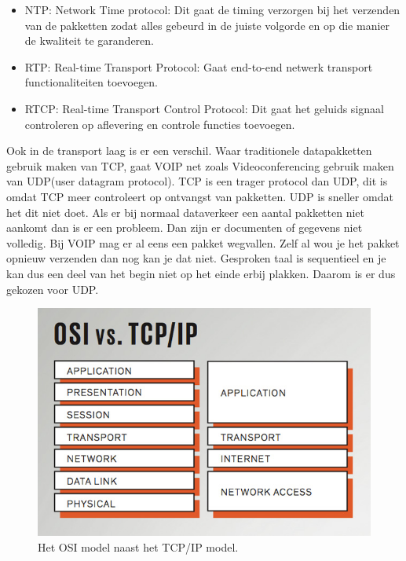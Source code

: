 \documentclass[pdftex,a4paper,12pt,twoside]{report}
\begin{document}
\begin{itemize}
	\item NTP: Network Time protocol: Dit gaat de timing verzorgen bij het verzenden van de pakketten zodat alles gebeurd in de juiste volgorde en op die manier de kwaliteit te garanderen.
	\item RTP: Real-time Transport Protocol: Gaat end-to-end netwerk transport functionaliteiten toevoegen.
	\item RTCP: Real-time Transport Control Protocol: Dit gaat het geluids signaal controleren op aflevering en controle functies toevoegen.
\end{itemize}

Ook in de transport laag is er een verschil. Waar traditionele datapakketten gebruik maken van TCP, gaat VOIP net zoals Videoconferencing gebruik maken van UDP(user datagram protocol). TCP is een trager protocol dan UDP, dit is omdat TCP meer controleert op ontvangst van pakketten. UDP is sneller omdat het dit niet doet. 
Als er bij normaal dataverkeer een aantal pakketten niet aankomt dan is er een probleem. Dan zijn er documenten of gegevens niet volledig. Bij VOIP mag er al eens een pakket wegvallen. Zelf al wou je het pakket opnieuw verzenden dan nog kan je dat niet. Gesproken taal is sequentieel en je kan dus een deel van het begin niet op het einde erbij plakken.
Daarom is er dus gekozen voor UDP. 



\begin{figure}[h]
\caption{Het OSI model naast het TCP/IP model.\protect \footnotemark}
\includegraphics[scale=0.5]{img/TCP}
\end{figure}
\end{document}
